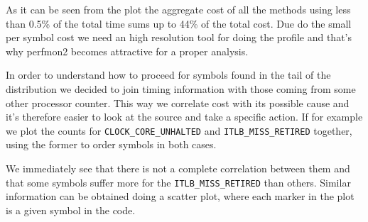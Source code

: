 \documentclass[a4paper]{jpconf}
\begin{document}
As it can be seen from the plot the aggregate cost of all the methods using less than 0.5\% of the total time sums up to 44\% of the total cost. Due do the small per symbol cost we need an high resolution tool for doing the profile and that's why perfmon2 becomes attractive for a proper analysis.


In order to understand how to proceed for symbols found in the tail of the distribution we decided to join timing information with those coming from some other processor counter. This way we correlate cost with its possible cause and it's therefore easier to look at the source and take a specific action. If for example we plot the counts for \texttt{CLOCK\_CORE\_UNHALTED} and \texttt{ITLB\_MISS\_RETIRED} together, using the former to order symbols in both cases.


\begin{figure}
\caption{}
\label{}
\begin{center}
\end{center}
\end{figure}



We immediately see that there is not a complete correlation between them and that some symbols suffer more for the \texttt{ITLB\_MISS\_RETIRED} than others. Similar information can be obtained doing a scatter plot, where each marker in the plot is a given symbol in the code.
\end{document}
